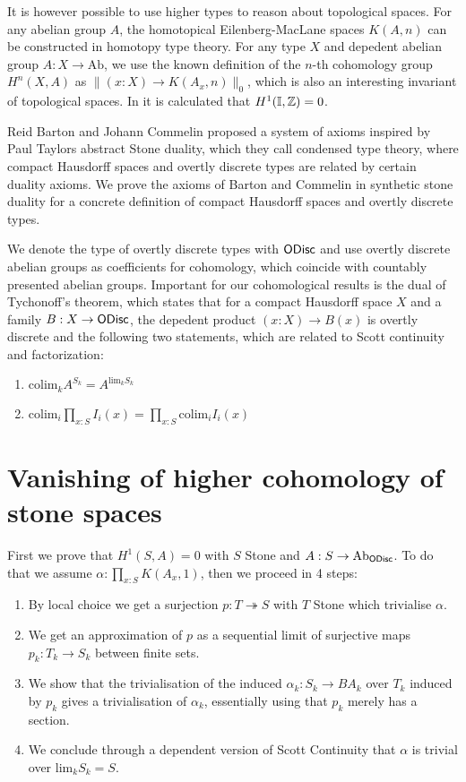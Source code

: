 \documentclass{../util/zariski}
\begin{document}
It is however possible to use higher types to reason about topological spaces.
For any abelian group $A$, the homotopical Eilenberg-MacLane spaces $K(A,n)$ can be constructed in homotopy type theory. For any type $X$ and depedent abelian group $A:X\to \mathrm{Ab}$, we use the known definition of the $n$-th cohomology group $H^n(X,A)$ as $\|(x:X)\to K(A_x,n)\|_0$, which is also an interesting invariant of topological spaces. In \cite{synthetic-stone-duality} it is calculated that $H^1(\mathbb{I},\mathbb{Z})=0$.

Reid Barton and Johann Commelin proposed a system of axioms inspired by Paul Taylors abstract Stone duality, which they call condensed type theory, where compact Hausdorff spaces and overtly discrete types are related by certain duality axioms. We prove the axioms of Barton and Commelin in synthetic stone duality for a concrete definition of compact Hausdorff spaces and overtly discrete types.

We denote the type of overtly discrete types with $\mathsf{ODisc}$ and use overtly discrete abelian groups as coefficients for cohomology, which coincide with countably presented abelian groups.
Important for our cohomological results is the dual of Tychonoff's theorem, which states that for a compact Hausdorff space $X$ and a family $B:X\to \mathsf{ODisc}$, the depedent product $(x:X)\to B(x)$ is overtly discrete and the following two statements, which are related to Scott continuity and factorization:
\begin{enumerate}[(1)]
\item $\mathrm{colim}_kA^{S_k}=A^{\mathrm{lim}_kS_k}$
\item $\mathrm{colim}_i\prod_{x:S}I_i(x)=\prod_{x:S}\mathrm{colim}_iI_i(x)$
\end{enumerate}

\section{Vanishing of higher cohomology of stone spaces}

First we prove that $H^1(S,A) = 0$ with $S$ Stone and  $A : S\to \mathrm{Ab}_{\mathsf{ODisc}}$. To do that we assume $\alpha:\prod_{x:S}K(A_x,1)$, then we proceed in 4 steps:
\begin{enumerate}[(1)]
\item By local choice we get a surjection $p:T\twoheadrightarrow S$ with $T$ Stone which trivialise $\alpha$.
\item We get an approximation of $p$ as a sequential limit of surjective maps $p_k:T_k\to S_k$ between finite sets.
\item We show that the trivialisation of the induced $\alpha_k:S_k\to BA_k$ over $T_k$ induced by $p_k$ gives a trivialisation of $\alpha_k$, essentially using that $p_k$ merely has a section.
\item We conclude through a dependent version of Scott Continuity that $\alpha$ is trivial over $\mathrm{lim}_kS_k =S$.
\end{enumerate}
\end{document}
